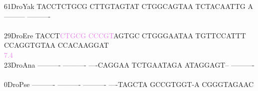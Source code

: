 \documentclass[11pt,twoside,reqno,a4paper]{article}
\begin{document}
{61\hspace*{2\charwidth}DroYak	TACCTCTGCG	CTTGTAGTAT	CTGGCAGTAA	TCTACAATTG	A---------	----------	\\
\hspace*{4\charwidth}\hspace*{7\charwidth}\hspace*{1\charwidth}\hspace*{1\charwidth}\hspace*{1\charwidth}\hspace*{1\charwidth}\hspace*{1\charwidth}\hspace*{1\charwidth}\\
29\hspace*{2\charwidth}DroEre	TACCT\textcolor{violet}{C}\textcolor{violet}{T}\textcolor{violet}{G}\textcolor{violet}{C}\textcolor{violet}{G}	\textcolor{violet}{C}\textcolor{violet}{C}\textcolor{violet}{C}\textcolor{violet}{G}\textcolor{violet}{T}AGTGC	CTGGGAATAA	TGTTCCATTT	CCAGGTGTAA	CCACAAGGAT	\\
\hspace*{4\charwidth}\hspace*{7\charwidth}\hspace*{5\charwidth}\textcolor{violet}{7.4}\hspace*{1\charwidth}\hspace*{1\charwidth}\hspace*{1\charwidth}\hspace*{1\charwidth}\hspace*{1\charwidth}\hspace*{1\charwidth}\\
23\hspace*{2\charwidth}DroAna	----------	----------	----CAGGAA	TCTGAATAGA	ATAGGAGT--	----------	\\
\hspace*{4\charwidth}\hspace*{7\charwidth}\hspace*{1\charwidth}\hspace*{1\charwidth}\hspace*{1\charwidth}\hspace*{1\charwidth}\hspace*{1\charwidth}\hspace*{1\charwidth}\\
0\hspace*{3\charwidth}DroPse	----------	----------	----------	----TAGCTA	GCCGTGGT-A	CGGGTAGAAC	\\
\hspace*{4\charwidth}\hspace*{7\charwidth}\hspace*{1\charwidth}\hspace*{1\charwidth}\hspace*{1\charwidth}\hspace*{1\charwidth}\hspace*{1\charwidth}\hspace*{1\charwidth}\\
}
\end{document}
